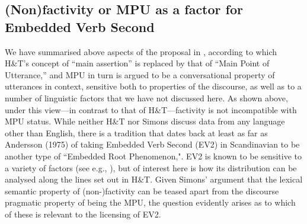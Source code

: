 \documentclass[output=paper]{LSP/langsci}
\begin{document}
\subsection{(Non)factivity or MPU as a factor for Embedded Verb Second}\label{nonfactivityOrMPU}

We have summarised above aspects of the proposal in \cite{simons07}, according to which H\&T's concept of ``main assertion'' is replaced by that of ``Main Point of Utterance,'' and MPU in turn is argued to be a conversational property of utterances in context, sensitive both to properties of the discourse, as well as to a number of linguistic factors that we have not discussed here.  As shown above, under this view---in contrast to that of H\&T---factivity is not incompatible with MPU status.  %
While neither H\&T nor Simons discuss data from any language other than English, there is a tradition that dates back at least as far as Andersson (1975) of taking Embedded Verb Second (EV2) in Scandinavian to be another type of ``Embedded Root Phenomenon,".  EV2 is known to be sensitive to a variety of factors (see e.g., \citealt{zwart97}), but of interest here is how its distribution can be analysed along the lines set out in H\&T. Given Simons' argument that the lexical semantic property of (non-)factivity can be teased apart from the discourse pragmatic property of being the MPU,  the question evidently arises as to which of these is relevant to the licensing of EV2.
\end{document}
